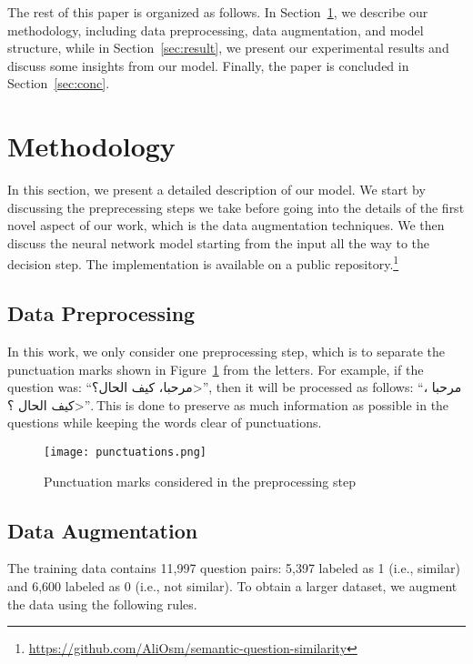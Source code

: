 \documentclass[11pt,a4paper]{article}
\begin{document}
The rest of this paper is organized as follows.
In Section~\ref{sec:method}, we describe our methodology, including data preprocessing, data augmentation, and model structure, while in Section~\ref{sec:result}, we present our experimental results and discuss some insights from our model. Finally, the paper is concluded in Section~\ref{sec:conc}.

\section{Methodology}
\label{sec:method}

In this section, we present a detailed description of our model. We start by discussing the preprecessing steps we take before going into the details of the first novel aspect of our work, which is the data augmentation techniques. We then discuss the neural network model starting from the input all the way to the decision step. The implementation is available on a public repository.\footnote{\url{https://github.com/AliOsm/semantic-question-similarity}}

\subsection{Data Preprocessing}

In this work, we only consider one preprocessing step, which is to separate the punctuation marks shown in Figure~\ref{punctuations} from the letters.
For example, if the question was: 
``\<مرحبا، كيف الحال؟>'', then it will be processed as follows:
``\<مرحبا ، كيف الحال ؟>''.
This is done to preserve as much information as possible in the questions while keeping the words clear of punctuations.

\begin{figure}
    \centering
    \texttt{[image: punctuations.png]}
    \caption{Punctuation marks considered in the preprocessing step}
    \label{punctuations}
\end{figure}

\subsection{Data Augmentation}
\label{sec:data_aug}

The training data contains 11,997 question pairs: 5,397 labeled as 1 (i.e., similar) and 6,600 labeled as 0 (i.e., not similar). To obtain a larger dataset, we augment the data using the following rules.
\end{document}

